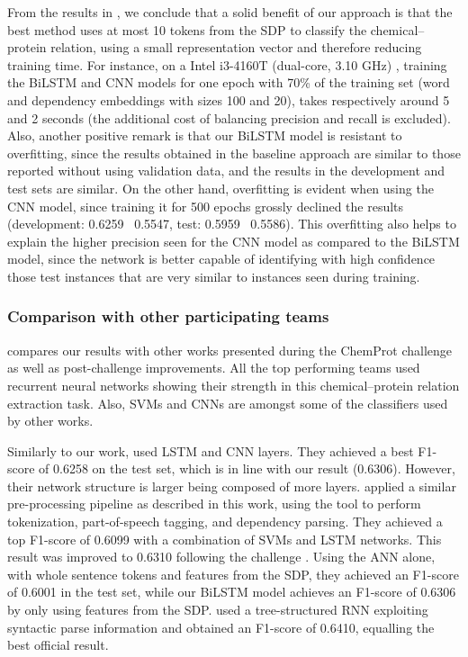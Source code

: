 From the results in , we conclude that a solid benefit of our approach is that the best method uses at most 10 tokens from the SDP to classify the chemical--protein relation, using a small representation vector and therefore reducing training time.
For instance, on a Intel i3-4160T (dual-core, 3.10 GHz) , training the BiLSTM and CNN models for one epoch with 70\% of the training set (word and dependency embeddings with sizes 100 and 20), takes respectively around 5 and 2 seconds (the additional cost of balancing precision and recall is excluded).
Also, another positive remark is that our BiLSTM model is resistant to overfitting, since the results obtained in the baseline approach are similar to those reported without using validation data, and the results in the development and test sets are similar.
On the other hand, overfitting is evident when using the CNN model, since training it for 500 epochs grossly declined the results (development: 0.6259 \versus\ 0.5547, test: 0.5959 \versus\ 0.5586).
This overfitting also helps to explain the higher precision seen for the CNN model as compared to the BiLSTM model, since the network is better capable of identifying with high confidence those test instances that are very similar to instances seen during training.


\subsubsection{Comparison with other participating teams}



 compares our results with other works presented during the ChemProt challenge as well as post-challenge improvements.
All the top performing teams used recurrent neural networks showing their strength in this chemical--protein relation extraction task.
Also, SVMs and CNNs are amongst some of the classifiers used by other works.

Similarly to our work, \textcite{corbett2017a,corbett2018a} used LSTM and CNN layers.
They achieved a best F1-score of 0.6258 on the test set, which is in line with our result (0.6306).
However, their network structure is larger being composed of more layers.
\textcite{mehryary2017a} applied a similar pre-processing pipeline as described in this work, using the  tool to perform tokenization, part-of-speech tagging, and dependency parsing.
They achieved a top F1-score of 0.6099 with a combination of SVMs and LSTM networks.
This result was improved to 0.6310 following the challenge \parencite{mehryary2018a}.
Using the ANN alone, with whole sentence tokens and features from the SDP, they achieved an F1-score of 0.6001 in the test set, while our BiLSTM model achieves an F1-score of 0.6306 by only using features from the SDP.
\textcite{lim2017a,lim2018a} used a tree-structured RNN exploiting syntactic parse information and obtained an F1-score of 0.6410, equalling the best official result.

